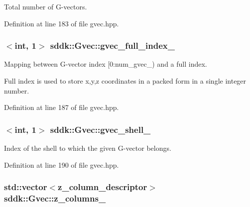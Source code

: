 Total number of G-\/vectors. 



Definition at line 183 of file gvec.\+hpp.

\hypertarget{classsddk_1_1_gvec_a27b03be0abec2f40aadeb0400ebfbfa4}{}
\subsubsection[{gvec\+\_\+full\+\_\+index\+\_\+}]{$<$int, 1$>$ sddk\+::\+Gvec\+::gvec\+\_\+full\+\_\+index\+\_\+\hspace{0.3cm}{\ttfamily [private]}}\label{classsddk_1_1_gvec_a27b03be0abec2f40aadeb0400ebfbfa4}


Mapping between G-\/vector index \mbox{[}0\+:num\+\_\+gvec\+\_\+) and a full index. 

Full index is used to store x,y,z coordinates in a packed form in a single integer number. 

Definition at line 187 of file gvec.\+hpp.

\hypertarget{classsddk_1_1_gvec_adc60dc3bc088745caaa64fe58996e155}{}
\subsubsection[{gvec\+\_\+shell\+\_\+}]{$<$int, 1$>$ sddk\+::\+Gvec\+::gvec\+\_\+shell\+\_\+\hspace{0.3cm}{\ttfamily [private]}}\label{classsddk_1_1_gvec_adc60dc3bc088745caaa64fe58996e155}


Index of the shell to which the given G-\/vector belongs. 



Definition at line 190 of file gvec.\+hpp.

\hypertarget{classsddk_1_1_gvec_afb61de598ed208a265d52656af86ab7d}{}
\subsubsection[{z\+\_\+columns\+\_\+}]{\setlength{\rightskip}{0pt plus 5cm}std\+::vector$<${\bf z\+\_\+column\+\_\+descriptor}$>$ sddk\+::\+Gvec\+::z\+\_\+columns\+\_\+\hspace{0.3cm}{\ttfamily [private]}}\label{classsddk_1_1_gvec_afb61de598ed208a265d52656af86ab7d}


